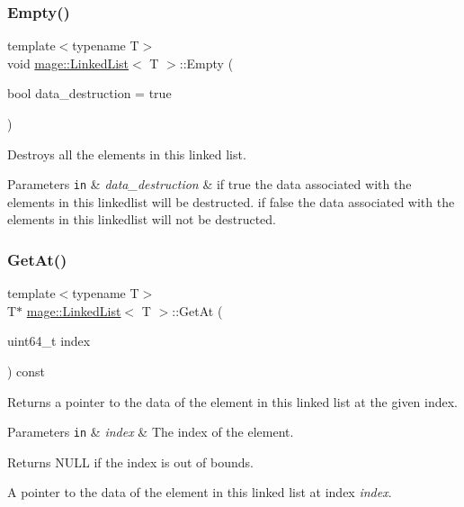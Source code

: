 \subsubsection{\texorpdfstring{Empty()}{Empty()}}
{\footnotesize\ttfamily template$<$typename T$>$ \\
void \hyperlink{classmage_1_1_linked_list}{mage\+::\+Linked\+List}$<$ T $>$\+::Empty (\begin{DoxyParamCaption}\item[{bool}]{data\+\_\+destruction = {\ttfamily true} }\end{DoxyParamCaption})}

Destroys all the elements in this linked list.


\begin{DoxyParams}[1]{Parameters}
\mbox{\tt in}  & {\em data\+\_\+destruction} & if {\ttfamily true} the data associated with the elements in this linkedlist will be destructed. if {\ttfamily false} the data associated with the elements in this linkedlist will not be destructed. \\
\hline
\end{DoxyParams}
\hypertarget{classmage_1_1_linked_list_a97922b200a12979e5c8692dd5f3f73d1}{}\label{classmage_1_1_linked_list_a97922b200a12979e5c8692dd5f3f73d1} 
\subsubsection{\texorpdfstring{Get\+At()}{GetAt()}}
{\footnotesize\ttfamily template$<$typename T$>$ \\
T$\ast$ \hyperlink{classmage_1_1_linked_list}{mage\+::\+Linked\+List}$<$ T $>$\+::Get\+At (\begin{DoxyParamCaption}\item[{uint64\+\_\+t}]{index }\end{DoxyParamCaption}) const}

Returns a pointer to the data of the element in this linked list at the given index.


\begin{DoxyParams}[1]{Parameters}
\mbox{\tt in}  & {\em index} & The index of the element. \\
\hline
\end{DoxyParams}
\begin{DoxyReturn}{Returns}
{\ttfamily N\+U\+LL} if the index is out of bounds. 

A pointer to the data of the element in this linked list at index {\itshape index}. 
\end{DoxyReturn}
\hypertarget{classmage_1_1_linked_list_a0da4ff247abafd3a496b379673c111c1}{}\label{classmage_1_1_linked_list_a0da4ff247abafd3a496b379673c111c1} 
